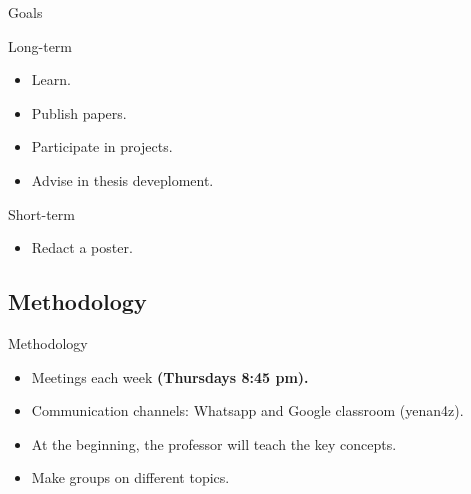 \documentclass[10pt]{beamer}
\newcommand{\1}{
        	\setbeamertemplate{background}{
        		\texttt{[image: img/1]}
        		\tikz[overlay] \fill[fill opacity=0.75,fill=white] (0,0) rectangle (-\paperwidth,\paperheight);
        	}
}
\begin{document}
\begin{frame}{Goals}{}
	\begin{block}{Long-term}
		\begin{itemize}
			\item Learn. \pause
			\item Publish papers. \pause
			\item Participate in projects. \pause
			\item Advise in thesis deveploment. \pause
		\end{itemize}
	\end{block}

	\begin{block}{Short-term}
		\begin{itemize}
			\item Redact a poster. 
		\end{itemize}
	\end{block}
\end{frame}


\subsection{Methodology}

\begin{frame}{Methodology}{}
	\begin{block}{}
		\begin{itemize}
			\item Meetings each week \textbf{(Thursdays 8:45 pm).} \pause
			\item Communication channels: Whatsapp and Google classroom (yenan4z). \pause
			\item At the beginning, the professor will teach the key concepts. \pause
			\item Make groups on different topics. 
		\end{itemize}
	\end{block}

\end{frame}
\end{document}
